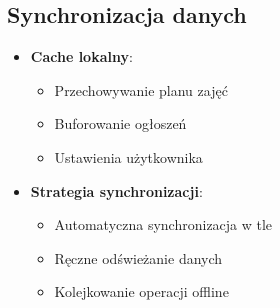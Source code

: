\subsection{Synchronizacja danych}

\begin{itemize}
	\item \textbf{Cache lokalny}:
	      \begin{itemize}
		      \item Przechowywanie planu zajęć
		      \item Buforowanie ogłoszeń
		      \item Ustawienia użytkownika
	      \end{itemize}

	\item \textbf{Strategia synchronizacji}:
	      \begin{itemize}
		      \item Automatyczna synchronizacja w tle
		      \item Ręczne odświeżanie danych
		      \item Kolejkowanie operacji offline
	      \end{itemize}
\end{itemize}
